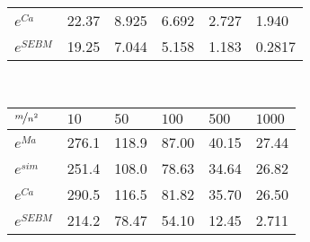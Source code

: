 \begin{table*}[]
\begin{minipage}[]{0.8\textwidth}
\begin{tabular}{llllll}
			$e^{Ca}$    & 22.37 & 8.925 & 6.692 & 2.727 & 1.940 \\
			$e^{SEBM}$  & 19.25 & 7.044 & 5.158 & 1.183 & 0.2817  \\
			\hline
			\end{tabular}
    \end{minipage}
	\\\vspace{4mm}
    \begin{minipage}[]{0.8\textwidth}
        \centering
        \caption{Complex Reward Division Game average errors}\label{tab4}
			\centering
			\begin{tabular}{llllll}
			\hline
			$\nicefrac{m}{n^2}$ & $10$ & $50$ & $100$ & $500$ & $1000$ \\
			\hline
			$e^{Ma}$   & 276.1 & 118.9 & 87.00 & 40.15 & 27.44 \\
			$e^{sim}$  & 251.4 & 108.0 & 78.63 & 34.64 & 26.82 \\
			$e^{Ca}$   & 290.5 & 116.5 & 81.82 & 35.70 & 26.50 \\
			$e^{SEBM}$ & 214.2 & 78.47 & 54.10 & 12.45 & 2.711  \\
			\hline
			\end{tabular}
    \end{minipage}
    \vspace{3mm}
    \caption{Average absolute errors in the Shapley value calculation across all players in the four cooperative games (units in $10^{-4}$), for the different sampling schemes with different sampling budgets $m$ per number of strata (with $n^2=15^2$ for all).}
    \label{Table2}
\end{table*}
